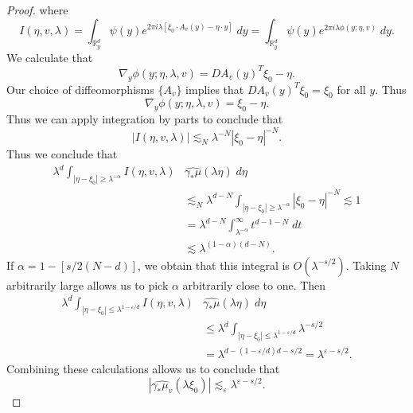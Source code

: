 \documentclass[dvipsnames,letterpaper,12pt]{article}
\DeclareMathOperator{\RR}{\mathbb{R}}
\begin{document}
\begin{proof}
    where
    \[ I(\eta,v,\lambda) = \int_{\RR^d_y} \psi(y) e^{2 \pi i \lambda [\xi_0 \cdot A_v(y) - \eta \cdot y]}\; dy = \int_{\RR^d_y} \psi(y) e^{2 \pi i \lambda \phi(y; \eta, v)}\; dy. \]
    We calculate that
    \[ \nabla_y \phi(y; \eta, \lambda, v) = DA_v(y)^T \xi_0 - \eta. \]
    Our choice of diffeomorphisms $\{ A_v \}$ implies that $DA_v(y)^T \xi_0 = \xi_0$ for all $y$. Thus
    \[ \nabla_y \phi(y; \eta, \lambda, v) = \xi_0 - \eta. \]
    Thus we can apply integration by parts to conclude that
    \[ |I(\eta,v,\lambda)| \lesssim_N \lambda^{-N} |\xi_0 - \eta|^{-N}. \]
    Thus we conclude that
    \begin{align*}
        \lambda^d \int_{|\eta - \xi_0| \geq \lambda^{-\alpha}} I(\eta, v,\lambda) & \widehat{\gamma_* \mu}(\lambda \eta)\; d\eta\\
        &\lesssim_N \lambda^{d - N} \int_{|\eta - \xi_0| \geq \lambda^{-\alpha}} |\xi_0 - \eta|^{-N} \lesssim 1\\
        &= \lambda^{d-N} \int_{\lambda^{-\alpha}}^\infty t^{d-1-N}\; dt\\
        &\lesssim \lambda^{(1 - \alpha)(d-N)}.
    \end{align*}
    If $\alpha = 1 - [ s / 2(N-d) ]$, we obtain that this integral is $O(\lambda^{-s/2})$. Taking $N$ arbitrarily large allows us to pick $\alpha$ arbitrarily close to one. Then
    \begin{align*}
        \lambda^d \int_{|\eta - \xi_0| \leq \lambda^{1-\varepsilon / d}} I(\eta,v,\lambda) & \widehat{\gamma_* \mu}(\lambda \eta)\; d\eta\\
        &\leq \lambda^d \int_{|\eta - \xi_0| \leq \lambda^{1-\varepsilon / d}} \lambda^{-s/2}\\
        &= \lambda^{d - (1 - \varepsilon / d) d - s/2} = \lambda^{\varepsilon - s/2}.
    \end{align*}
    Combining these calculations allows us to conclude that
    \[ |\widehat{\gamma_* \mu_v}(\lambda \xi_0)| \lesssim_\varepsilon \lambda^{\varepsilon - s/2}. \]




\end{proof}
\end{document}
